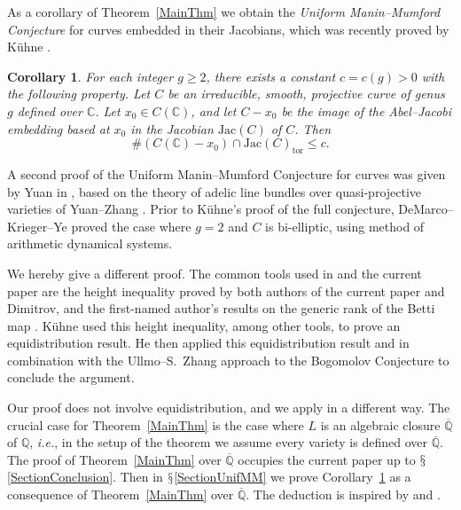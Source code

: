 \documentclass[12pt,oneside]{amsart}
\newcounter{maincounter}
\numberwithin{maincounter}{section}
\numberwithin{equation}{section}
\newtheorem{corollary}[maincounter]{Corollary}
\def\CC{\mathbb{C}}
\def\QQ{\mathbb{Q}}
\newcommand{\IC}{{\CC}}
\newcommand{\IQbar}{{\overline{\QQ}}}
\newcommand{\IQ}{{\QQ}}
\begin{document}
As a corollary  of Theorem~\ref{MainThm} we obtain  the \textit{Uniform
Manin--Mumford Conjecture} for curves embedded in their Jacobians, which was recently proved by K\"{u}hne
\cite[Theorem~1.2]{KuehneUnifMM}.

\begin{corollary}\label{CorUniformMM}
  For each integer $g \ge 2$, there exists a constant $c = c(g) > 0$ with the following property. 
  Let $C$ be an irreducible, smooth, projective curve of genus $g$
  defined over $\IC$. Let $x_0 \in C(\IC)$, and let $C-x_0$ be the
  image of the Abel--Jacobi embedding based at $x_0$ in the Jacobian
  $\mathrm{Jac}(C)$ of $C$. Then
  \begin{equation}
    \#(C(\IC)-x_0) \cap \mathrm{Jac}(C)_{\mathrm{tor}} \le c.
  \end{equation}
\end{corollary}

A second proof of the Uniform Manin--Mumford Conjecture for curves was given by Yuan in \cite{YuanArithBig}, based on the theory of adelic line bundles over 
quasi-projective varieties of Yuan--Zhang \cite{YuanZhangEqui}. Prior to K\"{u}hne's 
proof of the full conjecture, DeMarco--Krieger--Ye \cite{DeMarcoKriegerYeUniManinMumford} proved the case where $g = 2$ and $C$ is bi-elliptic, using method of 
arithmetic dynamical systems.


We hereby give a different proof. The
common tools used in \cite{KuehneUnifMM} and the current paper are the
height inequality \cite[Theorems 1.6 and B.1]{DGHUnifML} proved by both
authors of the current paper and Dimitrov, and the first-named
author's results on the generic rank of the Betti map \cite{GaoBettiRank}. K\"{u}hne used this height inequality,
among other tools, to prove an equidistribution result. 
He then applied this equidistribution result and %
\cite[Theorem 1.3]{GaoBettiRank} in combination with the Ullmo--S.~Zhang
approach to the Bogomolov Conjecture to conclude the argument.

Our proof does not involve equidistribution, and we apply
\cite{GaoBettiRank} in a different way.  The crucial case for
Theorem~\ref{MainThm} is the case where $L$ is an algebraic closure
$\IQbar$ of $\IQ$, \textit{i.e.}, in the setup of the theorem we assume every variety is defined over $\IQbar$. The proof of Theorem~\ref{MainThm} over $\IQbar$ occupies the current paper up to $\mathsection$\ref{SectionConclusion}. Then in
$\mathsection$\ref{SectionUnifMM} we prove
Corollary~\ref{CorUniformMM} as a consequence of
Theorem~\ref{MainThm} over $\IQbar$. The deduction is inspired by \cite[Theorem~2.4]{Stoll:Uniform} and \cite[Proposition~7.1]{DGHUnifML}.
\end{document}
